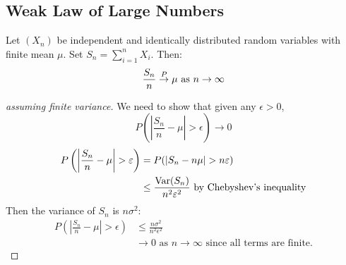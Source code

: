 \documentclass[../Main.tex]{subfiles}
\begin{document}
\subsection{Weak Law of Large Numbers}
\begin{theorem}
    Let $(X_n)$ be independent and identically distributed random variables with finite mean $\mu$. Set $S_n = \sum_{i = 1}^n X_i$. Then:
    \begin{equation*}
        \frac{S_n}{n} \overset{P}{\rightarrow} \mu \text{ as } n \to \infty
    \end{equation*}
    \label{thmWeakLawLargeNums}
\end{theorem}
\begin{proof}[assuming finite variance]
    We need to show that given any $\epsilon > 0$,
    \begin{equation*}
        P\left(\left|\frac{S_n}{n} - \mu\right| > \epsilon\right) \to 0
    \end{equation*}
    \begin{align*}
        P\left(\left|\frac{S_n}{n} - \mu\right| > \varepsilon\right) &= P(|S_n - n \mu| > n\varepsilon) \\
        &\leq \frac{\operatorname{Var}(S_n)}{n^2 \varepsilon^2} \text{ by Chebyshev's inequality}
    \end{align*}
    Then the variance of $S_n$ is $n \sigma^2$:
    \begin{align*}
        P\left(\left|\frac{S_n}{n} - \mu\right| > \epsilon\right) &\leq \frac{n\sigma^2}{n^2\epsilon^2} \\
        &\to 0 \text{ as } n \to \infty \text{ since all terms are finite.}
    \end{align*}
\end{proof}
\end{document}
